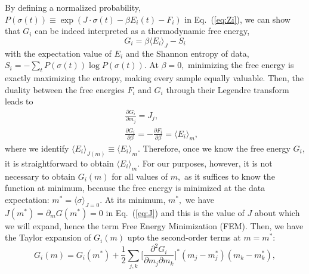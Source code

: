 \documentclass[prx,twocolumn,twoside,showpacs,superscriptaddress]{revtex4-1}
\begin{document}
{\color{blue}
By defining a normalized probability,
$P(\sigma(t)) \equiv \exp(J\cdot \sigma(t) - \beta E_i(t) - F_i)$
in Eq.~(\ref{eq:Zi}), we can show that $G_i$ can be indeed interpreted as a thermodynamic free energy,
\begin{equation}
G_i = \beta \langle E_i \rangle_{J} - S_i
\end{equation}
with the expectation value of $E_i$ and the Shannon entropy of data,
$S_i = - \sum_{t} P(\sigma(t)) \log P(\sigma(t))$.
At $\beta=0,$ minimizing the free energy is exactly maximizing the entropy, making every sample equally valuable. 
Then, the duality between the free energies $F_i$ and $G_i$ through their Legendre transform leads to
\begin{eqnarray}
\label{eq:J}
&& \frac{\partial G_i}{\partial m_j} = J_j,\\
&& \frac{\partial G_i}{\partial \beta} = -\frac{\partial F_i}{\partial \beta} = \langle E_i \rangle_{m},
\end{eqnarray}
where we identify $\langle E_i \rangle_{J(m)} \equiv \langle E_i \rangle_{m}$.
Therefore, once we know the free energy $G_i$, it is straightforward to obtain $\langle E_i \rangle_{m}$.
For our purposes, however, it is not necessary to obtain $G_i(m)$ for all values of $m,$ 
as it suffices to know the function at minimum, because the free energy is minimized at the data expectation:
$m^*=\langle \sigma \rangle_{J=0}$.
At its minimum, $m^*,$ we have $J(m^*)=\partial_mG(m^*)=0$ in Eq.~(\ref{eq:J}) and this is the value of $J$ about which we will expand, hence the term Free Energy Minimization (FEM).
Then, we have the Taylor expansion of  $G_i(m)$ upto the second-order terms at $m=m^*:$
\begin{equation}
\label{eq:Taylor}
G_i(m) = G_i(m^*) + \frac{1}{2} \sum_{j,k} \bigg[ \frac{\partial^2 G_i}{\partial m_j \partial m_k} \bigg]^* (m_j-m_j^*)(m_k-m_k^*),
\end{equation}
}
\end{document}
